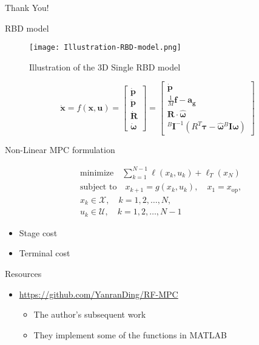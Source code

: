 \documentclass{beamer}
\begin{document}
\begin{frame}
	\LARGE{Thank You!}
\end{frame}\normalfont


\begin{frame}{RBD model}
\begin{figure}
    \centering
    \texttt{[image: Illustration-RBD-model.png]}
    \caption{Illustration of the 3D Single RBD model}
    \label{fig:rbd-model}
\end{figure}
\begin{equation*}
    \mathbf{\dot{x}} = f(\mathbf{x}, \mathbf{u}) = 
    \begin{bmatrix}
    \mathbf{\dot{p}} \\
    \mathbf{\ddot{p}} \\
    \mathbf{\dot{R}} \\
    \boldsymbol{\dot{\omega}}
    \end{bmatrix}
    =
    \begin{bmatrix}
    \mathbf{\dot{p}} \\
    \frac{1}{M} \mathbf{f} - \mathbf{a_g} \\
    \mathbf{R} \cdot \hat{\boldsymbol{\omega}} \\
    {}^{B} \mathbf{I}^{-1}(R^T \boldsymbol{\tau} - \hat{\boldsymbol{\omega}} {}^{B} \mathbf{I} \boldsymbol{\omega})
    \end{bmatrix}
\end{equation*}
\end{frame}


\begin{frame}{Non-Linear MPC formulation}

\begin{equation*}
\begin{aligned}
    & \text{minimize} \quad \sum_{k=1}^{N-1} \ell(x_k, u_k) + \ell_T(x_N) \\
    & \text{subject to} \quad x_{k+1} = g(x_k, u_k), \quad x_1 = x_\text{op}, \\
    & x_k \in \mathcal{X}, \quad k = 1, 2, \dots, N, \\
    & u_k \in \mathcal{U}, \quad k = 1, 2, \dots, N-1
\end{aligned}
\end{equation*}

\begin{itemize}
    \item Stage cost
    \item Terminal cost
\end{itemize}

\end{frame}


\begin{frame}{Resources}

\begin{itemize}
    \item \url{https://github.com/YanranDing/RF-MPC}
        \begin{itemize}
            \item The author's subsequent work
            \item They implement some of the functions in MATLAB
        \end{itemize}    
\end{itemize}

\end{frame}
\end{document}
